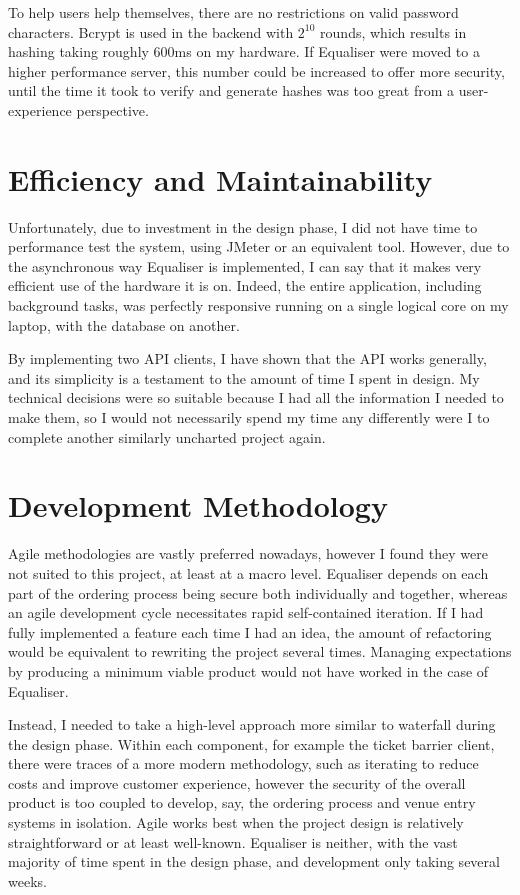 \documentclass[12pt,a4paper]{bhamdissertation}
\begin{document}
To help users help themselves, there are no restrictions on valid password characters. Bcrypt is used in the backend with $2^{10}$ rounds, which results in hashing taking roughly 600ms on my hardware. If Equaliser were moved to a higher performance server, this number could be increased to offer more security, until the time it took to verify and generate hashes was too great from a user-experience perspective.

\section{Efficiency and Maintainability}

Unfortunately, due to investment in the design phase, I did not have time to performance test the system, using JMeter or an equivalent tool. However, due to the asynchronous way Equaliser is implemented, I can say that it makes very efficient use of the hardware it is on. Indeed, the entire application, including background tasks, was perfectly responsive running on a single logical core on my laptop, with the database on another.

By implementing two API clients, I have shown that the API works generally, and its simplicity is a testament to the amount of time I spent in design. My technical decisions were so suitable because I had all the information I needed to make them, so I would not necessarily spend my time any differently were I to complete another similarly uncharted project again.

\section{Development Methodology}

Agile methodologies are vastly preferred nowadays, however I found they were not suited to this project, at least at a macro level. Equaliser depends on each part of the ordering process being secure both individually and together, whereas an agile development cycle necessitates rapid self-contained iteration. If I had fully implemented a feature each time I had an idea, the amount of refactoring would be equivalent to rewriting the project several times. Managing expectations by producing a minimum viable product would not have worked in the case of Equaliser.

Instead, I needed to take a high-level approach more similar to waterfall during the design phase. Within each component, for example the ticket barrier client, there were traces of a more modern methodology, such as iterating to reduce costs and improve customer experience, however the security of the overall product is too coupled to develop, say, the ordering process and venue entry systems in isolation. Agile works best when the project design is relatively straightforward or at least well-known. Equaliser is neither, with the vast majority of time spent in the design phase, and development only taking several weeks.
\end{document}
